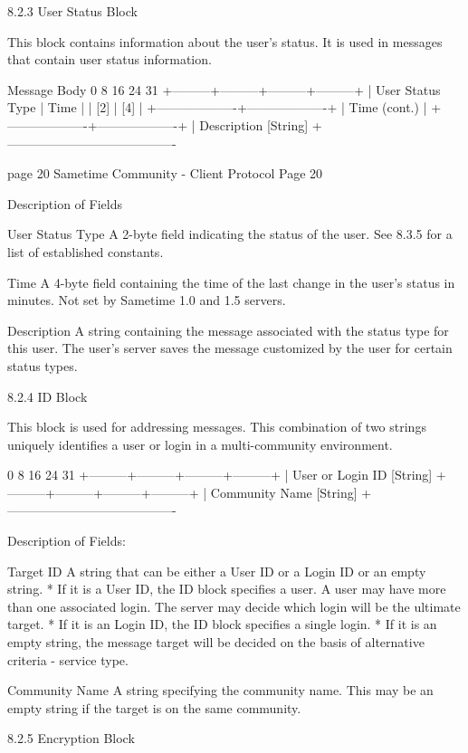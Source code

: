 \documentclass[titlepage,oneside]{book}
\begin{document}
8.2.3 User Status Block

This block contains information about the user's status. It is used in
messages that contain user status information.

Message Body
0         8         16        24      31
+---------+---------+---------+---------+
| User Status Type  |        Time       |
|        [2]        |        [4]        |
+-------------------+-------------------+
| Time (cont.)      |
+-------------------+-------------------+
|   Description [String]
+----------------------------------------

page 20  Sametime Community - Client Protocol   Page 20


Description of Fields

User Status Type
  A 2-byte field indicating the status of the user. See 
  8.3.5 for a list of established constants.

Time
  A 4-byte field containing the time of the last change in the user's
  status in minutes. Not set by Sametime 1.0 and 1.5 servers.

Description
  A string containing the message associated with the status type for
  this user. The user's server saves the message customized by the user
  for certain status types.

8.2.4 ID Block

This block is used for addressing messages. This combination of two
strings uniquely identifies a user or login in a multi-community
environment.

0         8         16        24      31
+---------+---------+---------+---------+
| User or Login ID [String]
+---------+---------+---------+---------+
| Community Name [String]
+----------------------------------------

Description of Fields:

Target ID
  A string that can be either a User ID or a Login ID or an empty
  string.
    * If it is a User ID, the ID block specifies a user. A user may
      have more than one associated login. The server may decide which
      login will be the ultimate target.
    * If it is an Login ID, the ID block specifies a single login.
    * If it is an empty string, the message target will be decided on
      the basis of alternative criteria - service type.

Community Name
  A string specifying the community name. This may be an empty string
  if the target is on the same community.

8.2.5 Encryption Block
\end{document}
